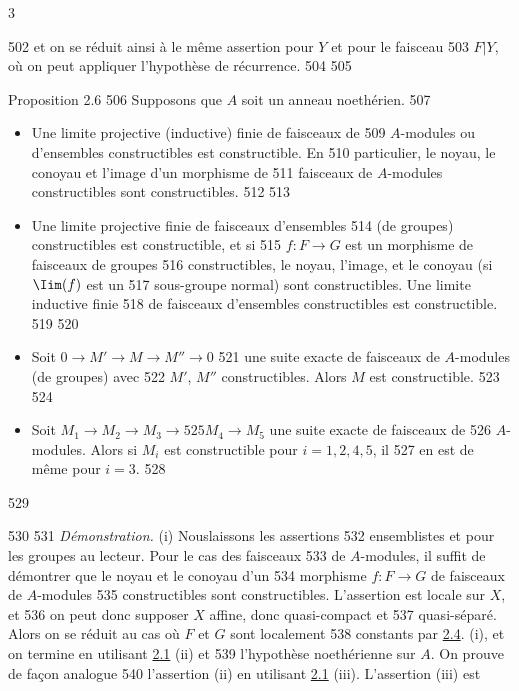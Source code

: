 3	\documentclass[10pt]{../fichiers-configuration-latex/smfart}
\begin{document}
   502	et on se réduit ainsi à le même assertion pour $Y$ et pour le faisceau
   503	$F| Y$, où on peut appliquer l'hypothèse de récurrence.
   504	
   505	\begin{enonce*}{Proposition 2.6}
   506	Supposons que $A$ soit un anneau noethérien.
   507	\begin{itemize}
   508	\item[(i)] Une limite projective (\resp inductive) finie de faisceaux de
   509	  $A$-modules ou d'ensembles constructibles est constructible. En
   510	  particulier, le noyau, le conoyau et l'image d'un morphisme de
   511	  faisceaux de $A$-modules constructibles sont constructibles.
   512	
   513	\item[(i bis)] Une limite projective finie de faisceaux d'ensembles
   514	  (\resp de groupes) constructibles est constructible, et si
   515	  $f:F\rightarrow G$ est un morphisme de faisceaux de groupes
   516	  constructibles, le noyau, l'image, et le conoyau (si $\Iim(f)$ est un
   517	  sous-groupe normal) sont constructibles. Une limite inductive finie
   518	  de faisceaux d'ensembles constructibles est constructible.
   519	
   520	\item[(ii)] Soit $0\rightarrow M'\rightarrow M\rightarrow M''\rightarrow 0$
   521	  une suite exacte de faisceaux de $A$-modules (\resp de groupes) avec
   522	  $M'$, $M''$ constructibles. Alors $M$ est constructible.
   523	
   524	\item[(iii)] Soit $M_1\rightarrow M_2\rightarrow M_3\rightarrow
   525	  M_4\rightarrow M_5$ une suite exacte de faisceaux de
   526	  $A$-modules. Alors si $M_i$ est constructible pour $i=1,2,4,5$, il
   527	  en est de même pour $i=3$.
   528	\end{itemize}
   529	\end{enonce*}
   530	
   531	\emph{Démonstration.} (i) Nous\pageoriginale laissons les assertions
   532	ensemblistes et pour les groupes au lecteur. Pour le cas des faisceaux
   533	de $A$-modules, il suffit de démontrer que le noyau et le conoyau d'un
   534	morphisme $f:F\rightarrow G$ de faisceaux de $A$-modules
   535	constructibles sont constructibles. L'assertion est locale sur $X$, et
   536	on peut donc supposer $X$ affine, donc quasi-compact et
   537	quasi-séparé. Alors on se réduit au cas où $F$ et $G$ sont localement
   538	constants par \hyperref[IX.prop2.4]{2.4}. (i), et on termine en utilisant \hyperref[IX.lem2.1]{2.1} (ii) et
   539	l'hypothèse noethérienne sur $A$. On prouve de façon analogue
   540	l'assertion (ii) en utilisant \hyperref[IX.lem2.1]{2.1} (iii). L'assertion (iii) est
\end{document}
